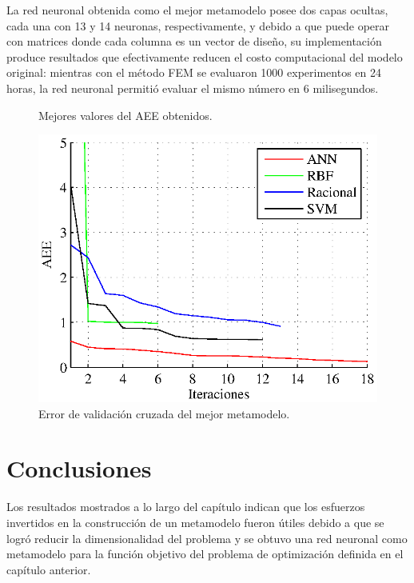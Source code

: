 La red neuronal obtenida como el mejor metamodelo posee dos capas ocultas, cada una con 13 y 14 neuronas, respectivamente, y debido a que puede operar con matrices donde cada columna es un vector de diseño, su implementación produce resultados que efectivamente reducen el costo computacional del modelo original: mientras con el método FEM se evaluaron 1000 experimentos en 24 horas, la red neuronal permitió evaluar el mismo número en 6 milisegundos.

\begin{figure}[t]
\centering
{}
\caption{Mejores valores del AEE obtenidos.}
\label{fig:bestaee}
\end{figure}

\begin{figure}[t]
\centering
\includegraphics[scale=0.9]{../img/Construccion_de_un_Metamodelo/bestprofiler.eps}
\caption{Error de validación cruzada del mejor metamodelo.}
\label{fig:bestprofiler}
\end{figure}

\section{Conclusiones}
Los resultados mostrados a lo largo del capítulo indican que los esfuerzos invertidos en la construcción de un metamodelo fueron útiles debido a que se logró reducir la dimensionalidad del problema y se obtuvo una red neuronal como metamodelo para la función objetivo del problema de optimización definida en el capítulo anterior.  

